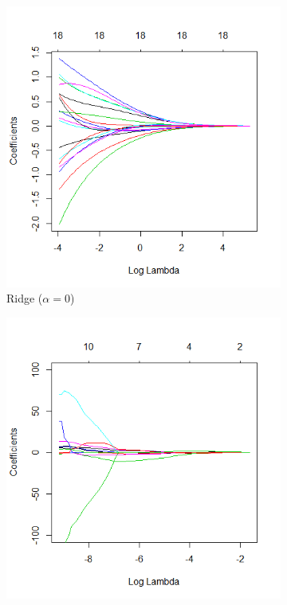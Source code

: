 \begin{figure}
	\centering
	\begin{subfigure}[b]{0.3\textwidth}
		\includegraphics[scale=0.3]{images/ridge_coefficients_path}
		\caption{Ridge ($\alpha=0$)}
		\label{fig:glm-path-ridge}
	\end{subfigure}
	\hfill
	\begin{subfigure}[b]{0.3\textwidth}
		\includegraphics[scale=0.3]{images/lasso_coefficients_path}

\end{subfigure}
\end{figure}
